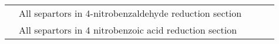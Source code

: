 {\begin{tabular}{@{}lp{5cm}p{2cm}p{2cm}p{12cm}@{}}
                                                      & All separtors in 4-nitrobenzaldehyde reduction section &                                                                                        &                                                   &                                                                                                                                                                                                                                                                                                                                                                                                                                                                                                                                                                                                                                                                                                                                                                                                                                                                                                                    \\ \cmidrule(l){2-2}
                                                      & All separtors in 4 nitrobenzoic acid reduction section &                                                                                        &                                                   &                                                                                                                                                                                                                                                                                                                                                                                                                                                                                                                                                                                                                                                                                                                                                                                                                                                                                                                    \\ \midrule

\end{tabular}}
